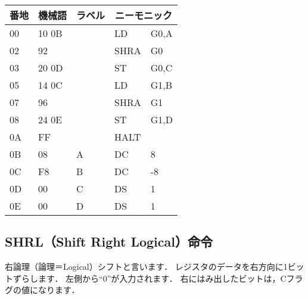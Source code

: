 \begin{description}
  {\ttfamily\begin{center}
    \begin{tabular}{|l|l|l|l l|} \hline
      番地 & 機械語 & ラベル & \multicolumn{2}{|c|}{ニーモニック} \\
      \hline
      00 & 10 0B &   & LD   & G0,A \\
      02 & 92    &   & SHRA & G0   \\
      03 & 20 0D &   & ST   & G0,C \\
      05 & 14 0C &   & LD   & G1,B \\
      07 & 96    &   & SHRA & G1   \\
      08 & 24 0E &   & ST   & G1,D \\
      0A & FF    &   & HALT &      \\
      0B & 08    & A & DC   & 8    \\
      0C & F8    & B & DC   & -8   \\
      0D & 00    & C & DS   & 1    \\
      0E & 00    & D & DS   & 1    \\
      \hline
    \end{tabular}
  \end{center}}
\end{description}

\newpage
\subsection{SHRL（Shift Right Logical）命令}
右論理（論理＝Logical）シフトと言います．
レジスタのデータを右方向に1ビットずらします．
左側から``0''が入力されます．
右にはみ出したビットは，Cフラグの値になります．

\begin{center}
\end{center}

